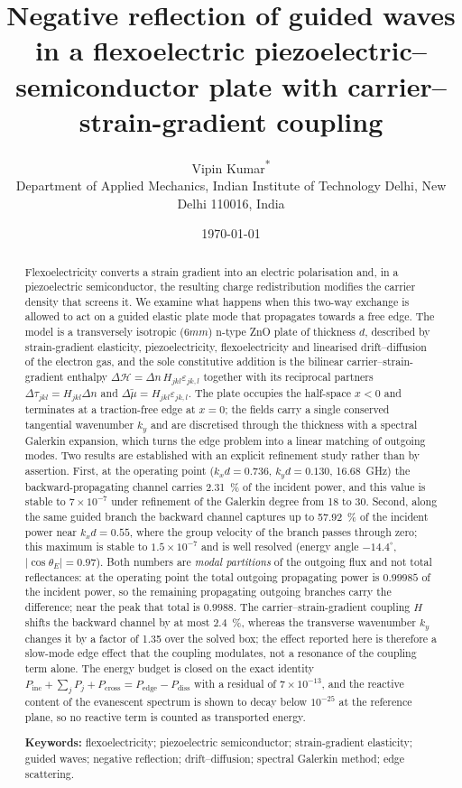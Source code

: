 \documentclass[10pt,a4paper]{article}
\title{\bfseries Negative reflection of guided waves in a flexoelectric
piezoelectric--semiconductor plate with carrier--strain-gradient coupling}
\author{Vipin Kumar\textsuperscript{*}\\[2pt]
\small Department of Applied Mechanics, Indian Institute of Technology Delhi,
New Delhi 110016, India}
\date{\today}
\begin{document}
\maketitle

\begin{abstract}
\noindent
Flexoelectricity converts a strain gradient into an electric polarisation and,
in a piezoelectric semiconductor, the resulting charge redistribution modifies
the carrier density that screens it.  We examine what happens when this
two-way exchange is allowed to act on a guided elastic plate mode that
propagates towards a free edge.  The model is a transversely isotropic
($6mm$) n-type ZnO plate of thickness $d$, described by strain-gradient
elasticity, piezoelectricity, flexoelectricity and linearised drift--diffusion
of the electron gas, and the sole constitutive addition is the bilinear
carrier--strain-gradient enthalpy $\Delta\mathcal{H}=\Delta n\,H_{jkl}
\varepsilon_{jk,l}$ together with its reciprocal partners
$\Delta\tau_{jkl}=H_{jkl}\Delta n$ and $\Delta\widetilde\mu=H_{jkl}
\varepsilon_{jk,l}$.  The plate occupies the half-space $x<0$ and terminates
at a traction-free edge at $x=0$; the fields carry a single conserved
tangential wavenumber $k_y$ and are discretised through the thickness with a
spectral Galerkin expansion, which turns the edge problem into a linear
matching of outgoing modes.
Two results are established with an explicit refinement study rather than by
assertion.  First, at the operating point ($k_xd=0.736$, $k_yd=0.130$,
\SI{16.68}{\giga\hertz}) the backward-propagating channel carries \SI{2.31}{\percent} of the incident
power, and this value is stable to $7\times10^{-7}$ under refinement of the
Galerkin degree from 18 to 30.
Second, along the same guided branch the backward channel captures up to
\SI{57.92}{\percent} of the incident power near $k_xd=0.55$, where the group velocity of
the branch passes through zero; this maximum is stable to
$1.5\times10^{-7}$ and is well resolved (energy angle $-14.4^{\circ}$,
$|\cos\theta_E|=0.97$).  Both numbers are \emph{modal partitions} of the
outgoing flux and not total reflectances: at the operating point the total
outgoing propagating power is $0.99985$ of the incident power, so the remaining
propagating outgoing branches carry the difference; near the peak that total is
$0.9988$.  The carrier--strain-gradient
coupling $H$ shifts the backward channel by at most \SI{2.4}{\percent}, whereas
the transverse wavenumber $k_y$ changes it by a factor of 1.35 over the solved
box; the effect reported here is therefore a slow-mode edge effect that the
coupling modulates, not a resonance of the coupling term alone.  The energy
budget is closed on the exact identity
$P_{\text{inc}}+\sum_jP_j+P_{\text{cross}}=P_{\text{edge}}-P_{\text{diss}}$
with a residual of $7\times10^{-13}$, and the reactive content of the
evanescent spectrum is shown to decay below $10^{-25}$ at the reference plane,
so no reactive term is counted as transported energy.

\medskip
\noindent\textbf{Keywords:} flexoelectricity; piezoelectric semiconductor;
strain-gradient elasticity; guided waves; negative reflection; drift--diffusion;
spectral Galerkin method; edge scattering.
\end{abstract}
\end{document}

